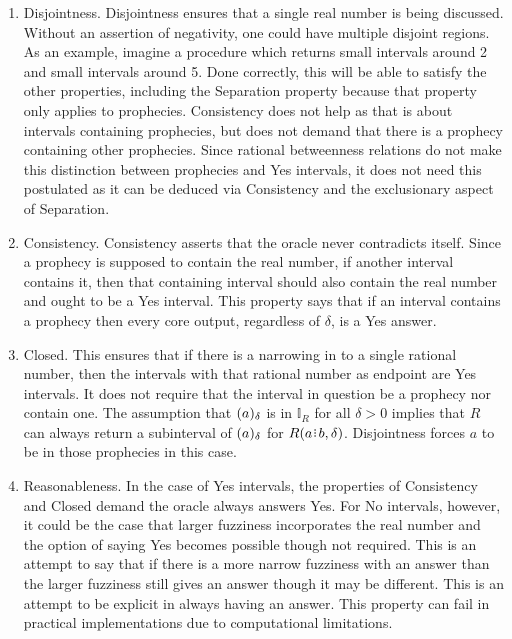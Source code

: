 \documentclass[12pt]{article}
\begin{document}
\begin{enumerate}
 
    \item Disjointness. Disjointness ensures that a single real number is being discussed. Without an assertion of negativity, one could have multiple disjoint regions.  As an example, imagine a procedure which returns small intervals around 2 and small intervals around 5. Done correctly, this will be able to satisfy the other properties, including the Separation property because that property only applies to prophecies. Consistency does not help as that is about intervals containing prophecies, but does not demand that there is a prophecy containing other prophecies.  Since rational betweenness relations do not make this distinction between prophecies and Yes intervals, it does not need this postulated as it can be deduced via Consistency and the exclusionary aspect of Separation. 
    
    \item Consistency. Consistency asserts that the oracle never contradicts itself. Since a prophecy is supposed to contain the real number, if another interval contains it, then that containing interval should also contain the real number and ought to be a Yes interval. This property says that if an interval contains a prophecy then every core output, regardless of $\delta$, is a Yes answer. 

    
    \item Closed. This ensures that if there is a narrowing in to a single rational number, then the intervals with that rational number as endpoint are Yes intervals. It does not require that the interval in question be a prophecy nor contain one. The assumption that $(a)_{\delta}$ is in $\mathbb{I}_R$ for all $\delta >0$ implies that $R$ can always return a subinterval of $(a)_{\delta}$ for $R(a\rint b, \delta)$. Disjointness forces $a$ to be in those prophecies in this case. 


    \item Reasonableness. In the case of Yes intervals, the properties of Consistency and Closed demand the oracle always answers Yes. For No intervals, however, it could be the case that larger fuzziness incorporates the real number and the option of saying Yes becomes possible though not required. This is an attempt to say that if there is a more narrow fuzziness with an answer than the larger fuzziness still gives an answer though it may be different. This is an attempt to be explicit in always having an answer. This property can fail in practical implementations due to computational limitations. 

\end{enumerate}
\end{document}
